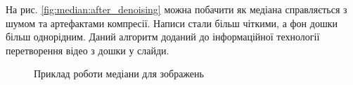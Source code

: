 На рис. \ref{fig:median:after_denoising} можна побачити як медіана справляється з шумом
та артефактами компресії.  Написи стали більш чіткими, а фон дошки більш однорідним.
Даний алгоритм доданий до інформаційної технології перетворення відео з дошки у слайди.

\begin{figure}[H]
    \centering
    \caption{Приклад роботи медіани для зображень \cite{video:mmzi:yakovlev_discrete_math}
    }
\end{figure}
